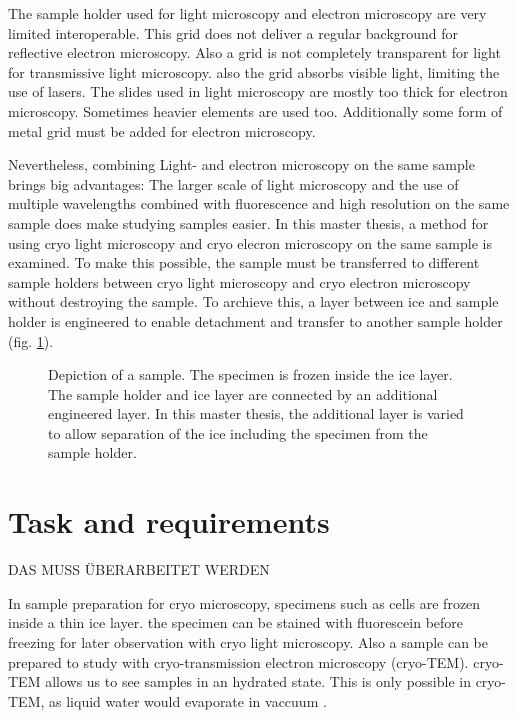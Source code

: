 The sample holder used for light microscopy and electron microscopy are very limited interoperable. This grid does not deliver a regular background for reflective electron microscopy. Also a grid is not completely transparent for light for transmissive light microscopy. also the grid absorbs visible light, limiting the use of lasers. The slides used in light microscopy are mostly too thick for electron microscopy. Sometimes heavier elements are used too. Additionally some form of metal grid must be added for electron microscopy. 

Nevertheless, combining Light- and electron microscopy on the same sample brings big advantages: The larger scale of light microscopy and the use of multiple wavelengths combined with fluorescence and high resolution on the same sample does make studying samples easier. In this master thesis, a method for using cryo light microscopy and cryo elecron microscopy on the same sample is examined. To make this possible, the sample must be transferred to different sample holders between cryo light microscopy and cryo electron microscopy without destroying the sample. To archieve this, a layer between  ice and sample holder is engineered to enable detachment and transfer to another sample holder (fig. \ref{fig:layersingeneral}).

\begin{figure}[hbt!]
	\centering
	
	\caption{Depiction of a sample. The specimen is frozen inside the ice layer. The sample holder and ice layer are connected by an additional engineered layer. In this master thesis, the additional layer is varied to allow separation of the ice including the specimen from the sample holder.}
	\label{fig:layersingeneral}
\end{figure}


\section{Task and requirements}

DAS MUSS ÜBERARBEITET WERDEN

In sample preparation for cryo microscopy, specimens such as cells are frozen inside a thin ice layer. the specimen can be stained with fluorescein before freezing for later observation with cryo light microscopy. Also a sample can be prepared to study with cryo-transmission electron microscopy (cryo-TEM). cryo-TEM allows us to see samples in an hydrated state. This is only possible in cryo-TEM, as liquid water would evaporate in vaccuum \cite{Danino.2012}.

